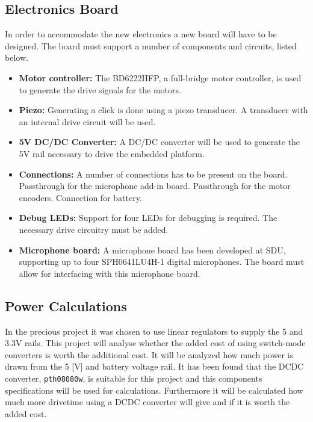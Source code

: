 \subsection{Electronics Board} %
\label{sub:electronics_board}
In order to accommodate the new electronics a new board will have to be designed.
The board must support a number of components and circuits, listed below.
\begin{itemize}
	\item \textbf{Motor controller:} The BD6222HFP, a full-bridge motor controller, is used to generate the drive signals for the motors.
	\item \textbf{Piezo:} Generating a click is done using a piezo transducer.
	A transducer with an internal drive circuit will be used.
	\item \textbf{5V DC/DC Converter:} A DC/DC converter will be used to generate the 5V rail necessary to drive the embedded platform.
	\item \textbf{Connections:} A number of connections has to be present on the board.
	Passthrough for the microphone add-in board.
	Passthrough for the motor encoders.
	Connection for battery.
	\item \textbf{Debug LEDs:} Support for four LEDs for debugging is required.
	The necessary drive circuitry must be added.
	\item \textbf{Microphone board:} A microphone board has been developed at SDU, supporting up to four SPH0641LU4H-1 digital microphones. The board must allow for interfacing with this microphone board.
\end{itemize}


\subsection{Power Calculations} %
\label{sub:power_calculations}
In the precious project it was chosen to use linear regulators to supply the 5 and 3.3V rails.
This project will analyse whether the added cost of using switch-mode converters is worth the additional cost.
It will be analyzed how much power is drawn from the 5 [V] and battery voltage rail.
It has been found that the DCDC converter, \texttt{pth08080w}, is suitable for this project and this components specifications will be used for calculations. 
Furthermore it will be calculated how much more drivetime using a DCDC converter will give and if it is worth the added cost. 

